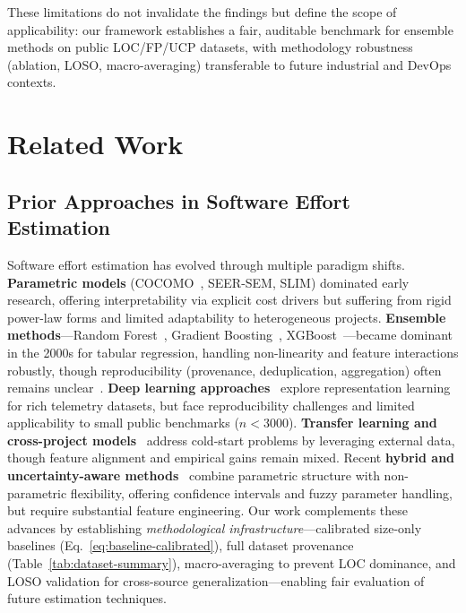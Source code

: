 \documentclass{ieeeaccess}
\begin{document}
\noindent These limitations do not invalidate the findings but define the scope of applicability: our framework establishes a fair, auditable benchmark for ensemble methods on public LOC/FP/UCP datasets, with methodology robustness (ablation, LOSO, macro-averaging) transferable to future industrial and DevOps contexts.




\section{Related Work}
\label{sec:related}

\subsection{Prior Approaches in Software Effort Estimation}

Software effort estimation has evolved through multiple paradigm shifts.
\textbf{Parametric models} (COCOMO~\cite{boehm1981software}, SEER-SEM, SLIM) dominated early research, offering interpretability via explicit cost drivers but suffering from rigid power-law forms and limited adaptability to heterogeneous projects.
\textbf{Ensemble methods}---Random Forest~\cite{breiman2001random}, Gradient Boosting~\cite{friedman2001greedy}, XGBoost~\cite{chen2016xgboost}---became dominant in the 2000s for tabular regression, handling non-linearity and feature interactions robustly, though reproducibility (provenance, deduplication, aggregation) often remains unclear~\cite{pandey2023comprehensive}.
\textbf{Deep learning approaches}~\cite{choetkiertikul2018deep,alqadi2021deep} explore representation learning for rich telemetry datasets, but face reproducibility challenges and limited applicability to small public benchmarks ($n{<}3000$).
\textbf{Transfer learning and cross-project models}~\cite{kocaguneli2013exploiting} address cold-start problems by leveraging external data, though feature alignment and empirical gains remain mixed.
Recent \textbf{hybrid and uncertainty-aware methods}~\cite{liu2024fuzzy,wang2025pattern,zhang2024uncertainty,chen2025hybrid} combine parametric structure with non-parametric flexibility, offering confidence intervals and fuzzy parameter handling, but require substantial feature engineering.
Our work complements these advances by establishing \emph{methodological infrastructure}---calibrated size-only baselines (Eq.~\ref{eq:baseline-calibrated}), full dataset provenance (Table~\ref{tab:dataset-summary}), macro-averaging to prevent LOC dominance, and LOSO validation for cross-source generalization---enabling fair evaluation of future estimation techniques.
\end{document}
